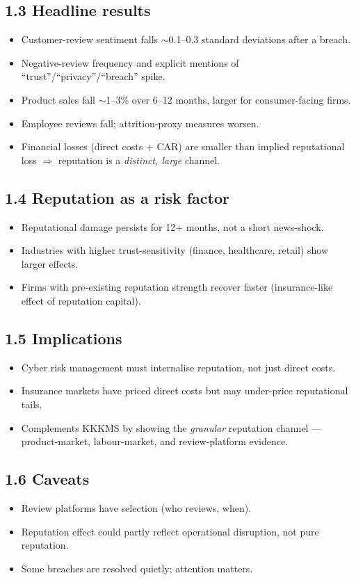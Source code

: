 \documentclass[11pt]{article}
\begin{document}
\subsection*{1.3 Headline results}
\begin{itemize}
\item Customer-review sentiment falls $\sim$0.1--0.3 standard deviations after a breach.
\item Negative-review frequency and explicit mentions of ``trust''/``privacy''/``breach'' spike.
\item Product sales fall $\sim$1--3\% over 6--12 months, larger for consumer-facing firms.
\item Employee reviews fall; attrition-proxy measures worsen.
\item Financial losses (direct costs + CAR) are smaller than implied reputational loss $\Rightarrow$ reputation is a \emph{distinct, large} channel.
\end{itemize}

\subsection*{1.4 Reputation as a risk factor}
\begin{itemize}
\item Reputational damage persists for 12+ months, not a short news-shock.
\item Industries with higher trust-sensitivity (finance, healthcare, retail) show larger effects.
\item Firms with pre-existing reputation strength recover faster (insurance-like effect of reputation capital).
\end{itemize}

\subsection*{1.5 Implications}
\begin{itemize}
\item Cyber risk management must internalise reputation, not just direct costs.
\item Insurance markets have priced direct costs but may under-price reputational tails.
\item Complements KKKMS by showing the \emph{granular} reputation channel --- product-market, labour-market, and review-platform evidence.
\end{itemize}

\subsection*{1.6 Caveats}
\begin{alertbox}
\begin{itemize}
\item Review platforms have selection (who reviews, when).
\item Reputation effect could partly reflect operational disruption, not pure reputation.
\item Some breaches are resolved quietly; attention matters.
\end{itemize}
\end{alertbox}
\end{document}

